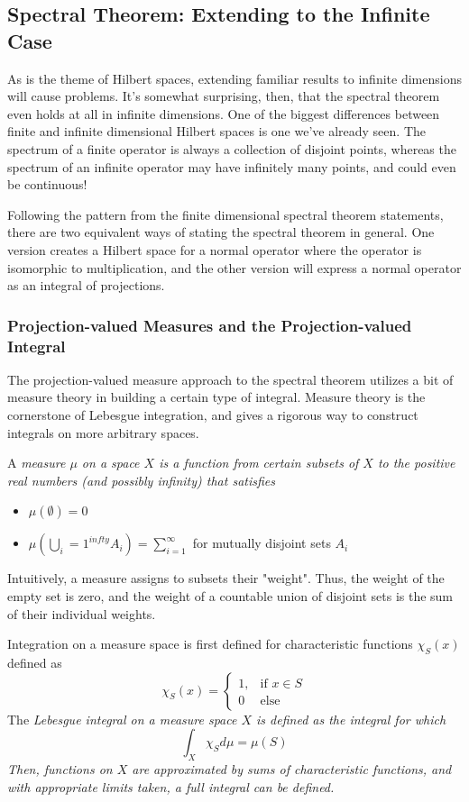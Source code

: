 \subsection{Spectral Theorem: Extending to the Infinite Case}

As is the theme of Hilbert spaces, extending familiar results to infinite
dimensions will cause problems. It's somewhat surprising, then, that the
spectral theorem even holds at all in infinite dimensions. One of the biggest
differences between finite and infinite dimensional Hilbert spaces is one we've
already seen. The spectrum of a finite operator is always a collection of
disjoint points, whereas the spectrum of an infinite operator may have
infinitely many points, and could even be continuous!

Following the pattern from the finite dimensional spectral theorem statements,
there are two equivalent ways of stating the spectral theorem in general. One
version creates a Hilbert space for a normal operator where the operator is
isomorphic to multiplication, and the other version will express a normal
operator as an integral of projections.

\subsubsection{Projection-valued Measures and the Projection-valued Integral}
The projection-valued measure approach to the spectral theorem utilizes a bit of
measure theory in building a certain type of integral. Measure theory is the
cornerstone of Lebesgue integration, and gives a rigorous way to construct
integrals on more arbitrary spaces.

A \em measure \em $\mu$ on a space $X$ is a function from certain subsets of $X$
to the positive real numbers (and possibly infinity) that satisfies
\begin{itemize}
    \itemsep0em
    \item $\mu(\emptyset) = 0$
    \item $\mu(\bigcup_i=1^{infty}A_i) = \sum_{i=1}^{\infty}$ for mutually
        disjoint sets $A_i$

\end{itemize}

Intuitively, a measure assigns to subsets their "weight". Thus, the weight of
the empty set is zero, and the weight of a countable union of disjoint sets is
the sum of their individual weights.

Integration on a measure space is first defined for characteristic functions
$\chi_S(x)$ defined as
\[
    \chi_S(x) =
    \begin{cases}
        1, &\text{if }x\in S\\
        0 &\text{else}
    \end{cases}
    \]
The \em Lebesgue integral \em on a measure space $X$ is defined as the integral
for which
\[
    \int_X \chi_S d\mu = \mu(S)
\]
Then, functions on $X$ are approximated by sums of characteristic functions, and
with appropriate limits taken, a full integral can be defined.


